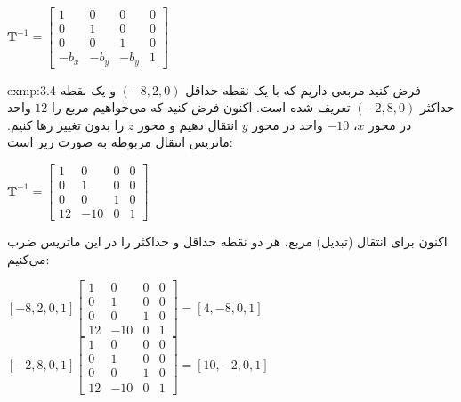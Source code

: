 {\begin{spacing}{1.5}
        \begin{center}
            $\textbf{T}^{-1}=\begin{bmatrix}
                                 1      & 0      & 0      & 0 \\
                                 0      & 1      & 0      & 0 \\
                                 0      & 0      & 1      & 0 \\
                                 -b_{x} & -b_{y} & -b_{y} & 1
            \end{bmatrix}$
        \end{center}

        \begin{exmp}{exmp:3.4}
            \Large
            فرض کنید مربعی داریم که با یک نقطه حداقل $(-8, 2, 0)$ و یک نقطه حداکثر $(-2, 8, 0)$ تعریف شده است.
            اکنون فرض کنید که می‌خواهیم مربع را $12$ واحد در محور $x$، $-10$ واحد در محور $y$ انتقال دهیم
            و محور $z$ را بدون تغییر رها کنیم.
            ماتریس انتقال مربوطه به صورت زیر است:

            \begin{center}
                $\textbf{T}^{-1}=\begin{bmatrix}
                                     1  & 0   & 0 & 0 \\
                                     0  & 1   & 0 & 0 \\
                                     0  & 0   & 1 & 0 \\
                                     12 & -10 & 0 & 1
                \end{bmatrix}$
            \end{center}

            اکنون برای انتقال (تبدیل) مربع، هر دو نقطه حداقل و حداکثر را در این ماتریس ضرب می‌کنیم:

            \begin{center}
                $[-8, 2, 0, 1]\begin{bmatrix}
                                  1  & 0   & 0 & 0 \\
                                  0  & 1   & 0 & 0 \\
                                  0  & 0   & 1 & 0 \\
                                  12 & -10 & 0 & 1
                \end{bmatrix}=[4, -8, 0, 1]$ \\
                $[-2, 8, 0, 1]\begin{bmatrix}
                                  1  & 0   & 0 & 0 \\
                                  0  & 1   & 0 & 0 \\
                                  0  & 0   & 1 & 0 \\
                                  12 & -10 & 0 & 1
                \end{bmatrix}=[10, -2, 0, 1]$
            \end{center}


\end{exmp}
\end{spacing}}
